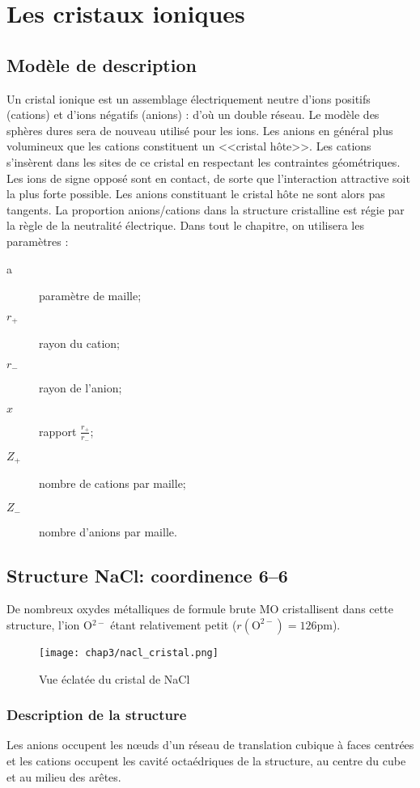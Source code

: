 \chapter{Les cristaux ioniques}
\section{Modèle de description}
Un cristal ionique est un assemblage électriquement neutre d'ions positifs (cations)
et d'ions négatifs (anions) : d'où un double réseau. Le modèle des sphères dures sera
de nouveau utilisé pour les ions.
Les anions en général plus volumineux que les cations constituent un <<cristal hôte>>.
Les cations s’insèrent dans les sites de ce cristal en respectant les contraintes 
géométriques. Les ions de signe opposé sont en contact, de sorte que l'interaction attractive
soit la plus forte possible. Les anions constituant le cristal hôte ne sont alors 
pas tangents. La proportion anions/cations dans la structure cristalline est régie 
par la règle de la neutralité électrique.
Dans tout le chapitre, on utilisera les paramètres :
\begin{description}
    \item[a] paramètre de maille;
    \item[$r_+$] rayon du cation;
    \item[$r_-$] rayon de l'anion;
    \item[$x$] rapport $\frac{r_+}{r_-}$;
    \item[$Z_+$] nombre de cations par maille;
    \item[$Z_-$] nombre d'anions par maille.
\end{description}

\section{Structure NaCl: coordinence 6\---6}
De nombreux oxydes métalliques de formule brute MO cristallisent dans cette
structure, l'ion O$^{2-}$ étant relativement petit ($r(\text{O}^{2-}) = 126$pm).

\begin{figure}
    \centering
    \texttt{[image: chap3/nacl\_cristal.png]}
    \caption{Vue éclatée du cristal de NaCl}\label{fig:3_nacl_cristal}
\end{figure}
\subsection{Description de la structure}
Les anions occupent les n\oe uds d'un réseau de translation cubique à faces
centrées et les cations occupent les cavité octaédriques de la structure,
au centre du cube et au milieu des arêtes.\\

